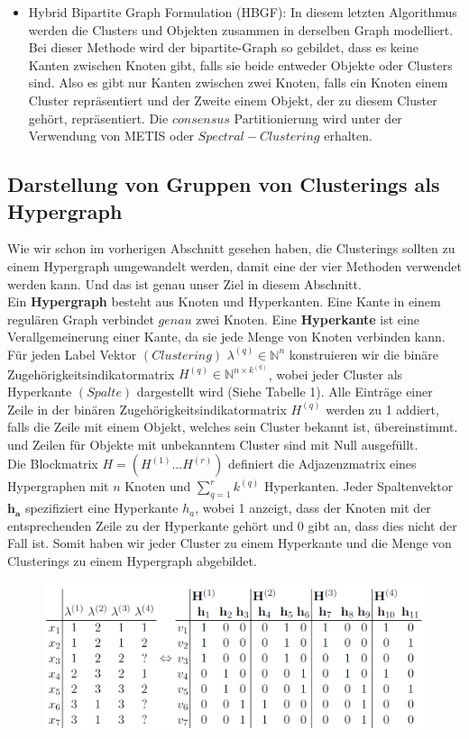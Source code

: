 \documentclass[runningheads]{llncs}
\begin{document}
\begin{itemize}
	\item Hybrid Bipartite Graph Formulation (HBGF): In diesem letzten Algorithmus werden die Clusters und Objekten zusammen in derselben Graph modelliert. Bei dieser Methode wird der bipartite-Graph so gebildet, dass es keine Kanten zwischen Knoten gibt, falls sie beide entweder Objekte oder Clusters sind. Also es gibt nur Kanten zwischen zwei Knoten, falls ein Knoten einem Cluster repräsentiert und der Zweite einem Objekt, der zu diesem Cluster gehört, repräsentiert. Die $consensus$ Partitionierung wird unter der Verwendung von METIS oder $Spectral-Clustering$ erhalten.  
\end{itemize}  


\subsection{Darstellung von Gruppen von Clusterings als Hypergraph}
Wie wir schon im vorherigen Abschnitt gesehen haben, die Clusterings sollten zu einem Hypergraph umgewandelt werden, damit eine der vier Methoden verwendet werden kann. Und das ist genau unser Ziel in diesem Abschnitt.\\
Ein \textbf{Hypergraph} besteht aus Knoten und Hyperkanten. Eine Kante in einem regulären Graph verbindet $genau$ zwei Knoten. Eine \textbf{Hyperkante} ist eine Verallgemeinerung einer Kante, da sie jede Menge von Knoten verbinden kann.\\[4pt]
Für jeden Label Vektor $(Clustering)$ $\lambda^{(q)} \in \mathbb{N}^{n}$ konstruieren wir die binäre Zugehörigkeitsindikatormatrix  $H^{(q)} \in \mathbb{N}^{n \times k^{(q)}}$, wobei jeder Cluster als Hyperkante $(Spalte)$ dargestellt wird (Siehe Tabelle 1). Alle Einträge einer Zeile in der binären Zugehörigkeitsindikatormatrix $H^{(q)}$ werden zu 1 addiert, falls die Zeile mit einem Objekt, welches sein Cluster bekannt ist, übereinstimmt. und Zeilen für Objekte mit unbekanntem Cluster sind mit Null ausgefüllt.\\
Die Blockmatrix $H = (H^{(1)} \ldots H^{(r)})$ definiert die Adjazenzmatrix eines Hypergraphen mit $n$ Knoten und $\sum_{q=1}^{r} k^{(q)}$ Hyperkanten. Jeder Spaltenvektor $\boldsymbol{h_{a}}$ spezifiziert eine Hyperkante $h_{a}$, wobei 1 anzeigt, dass der Knoten mit der entsprechenden Zeile zu der Hyperkante gehört und 0 gibt an, dass dies nicht der Fall ist. Somit haben wir jeder Cluster zu einem Hyperkante und die Menge von Clusterings zu einem Hypergraph abgebildet.\\ 
\begin{figure}[t]
	\includegraphics[width=\textwidth]{tablle1}
\end{figure}
\end{document}
